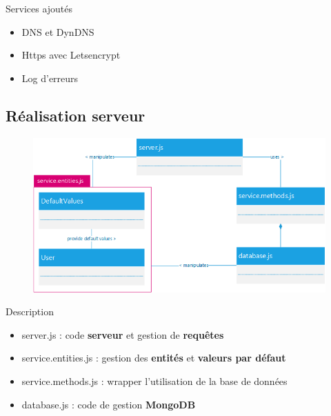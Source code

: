 \documentclass{beamer} %
\begin{document}
\begin{frame}{\subsecname}
    \pause

    \begin{exampleblock}{Services ajoutés}
      \begin{itemize}
        \item DNS et DynDNS
        \item Https avec Letsencrypt
        \item Log d'erreurs
      \end{itemize}
    \end{exampleblock}

  \end{frame}

  \subsection{Réalisation serveur}
  \begin{frame}{\subsecname}
    \vspace*{-2mm}
    \begin{figure}
      \includegraphics[width=0.8\linewidth, height=\textheight, keepaspectratio]{architecture-service-web-simple.png}
    \end{figure}

    \pause

    \begin{block}{Description}
      \begin{itemize}
        \item server.js : code \textbf{serveur} et gestion de \textbf{requêtes} \pause
        \item service.entities.js : gestion des \textbf{entités} et \textbf{valeurs par défaut} \pause
        \item service.methods.js : wrapper l'utilisation de la base de données \pause
        \item database.js : code de gestion \textbf{MongoDB}
      \end{itemize}
    \end{block}
  \end{frame}
\end{document}
